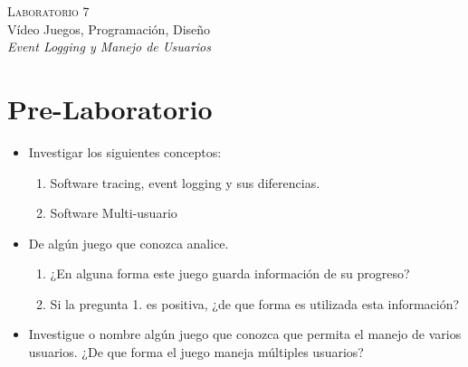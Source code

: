 \begin{center}
\textsc{\Large Laboratorio 7}~\\
{\large Vídeo Juegos, Programación, Diseño}~\\
\emph{Event Logging y Manejo de Usuarios}
\end{center}

\section{Pre-Laboratorio}
\begin{itemize}
\item Investigar los siguientes conceptos:
\begin{enumerate}
  \item Software tracing, event logging y sus diferencias.
  \item Software Multi-usuario
\end{enumerate}
\item De algún juego que conozca analice.
\begin{enumerate}
  \item ¿En alguna forma este juego guarda información de su progreso?
  \item Si la pregunta 1. es positiva, ¿de que forma es utilizada esta información?
\end{enumerate}
\item Investigue o nombre algún juego que conozca que permita el manejo de varios usuarios. ¿De que forma el juego maneja múltiples usuarios?
\end{itemize}

